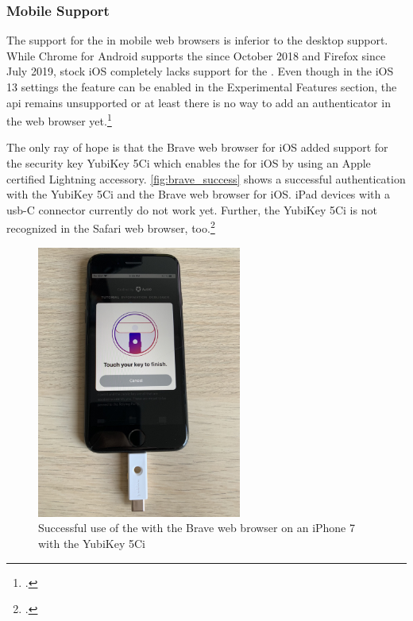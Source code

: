 \subsubsection{Mobile Support}

The support for the \wa{} in mobile web browsers is inferior to the desktop support. While Chrome for Android supports the \wa{} since October 2018 and Firefox since July 2019, stock iOS completely lacks support for the \wa. Even though in the iOS 13 settings the feature can be enabled in the \frqq Experimental Features\flqq{} section, the \gls{api} remains unsupported or at least there is no way to add an authenticator in the web browser yet.\footcites[See][]{chrome-android-webauthn}[See]{firefox-android-webauthn}

The only ray of hope is that the Brave web browser for iOS added support for the security key \frqq YubiKey 5Ci\flqq{} which enables the \wa{} for iOS by using an Apple certified Lightning accessory. \autoref{fig:brave_success} shows a successful authentication with the YubiKey 5Ci and the Brave web browser for iOS. iPad devices with a \gls{usb}-C connector currently do not work yet. Further, the YubiKey 5Ci is not recognized in the Safari web browser, too.\footcites[See][]{brave-ios}[See][]{brave-now-available}[See][]{fido-ct-6}

\begin{figure}[hbt]
	\centering
	\includegraphics[width=0.6\textwidth]{pics/brave_success_5ci.eps}
	\caption[Successful use of the \wa{} with the Brave web browser on an iPhone 7 with the YubiKey 5Ci]{Successful use of the \wa{} with the Brave web browser on an iPhone 7 with the YubiKey 5Ci\footnotemark}
	\label{fig:brave_success}
\end{figure}


